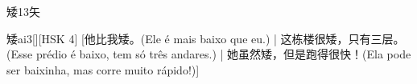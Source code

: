 \begin{entry}{矮}{13}{⽮}
  \begin{phonetics}{矮}{ai3}[][HSK 4]
    [他比我矮。(Ele é mais baixo que eu.) | 这栋楼很矮，只有三层。(Esse prédio é baixo, tem só três andares.) | 她虽然矮，但是跑得很快！(Ela pode ser baixinha, mas corre muito rápido!)]
  \end{phonetics}
\end{entry}
